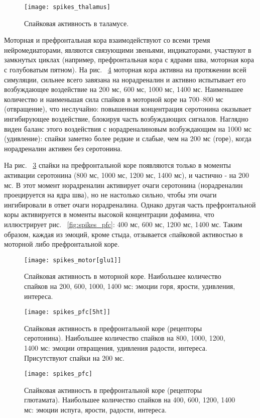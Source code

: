\begin{figure}
	\centering
	\texttt{[image: spikes\_thalamus]}
	\caption{Спайковая активность в таламусе.}
	\label{fig:spikes_thalamus}
\end{figure}

Моторная и префронтальная кора взаимодействуют со всеми тремя нейромедиаторами, являются связующими звеньями, индикаторами, участвуют в замкнутых циклах (например, префронтальная кора с ядрами шва, моторная кора с голубоватым пятном). На рис. ~\ref{fig:spikes_motor} моторная кора активна на протяжении всей симуляции, сильнее всего завязана на норадреналин и активно испытывает его возбуждающее воздействие на 200 мс, 600 мс, 1000 мс, 1400 мс. Наименьшее количество и наименьшая сила спайков в моторной коре на 700--800 мс (отвращение), что неслучайно: повышенная концентрация серотонина оказывает ингибирующее воздействие, блокируя часть возбуждающих сигналов. Наглядно виден баланс этого воздействия с норадреналиновым возбуждающим на 1000 мс (удивление): спайки заметно более редкие и слабые, чем на 200 мс (горе), когда норадреналин активен без серотонина.


На рис. ~\ref{fig:spikes_pfc[5ht]} спайки на префронтальной коре появляются только в моменты активации серотонина (800 мс, 1000 мс, 1200 мс, 1400 мс), и частично - на 200 мс. В этот момент норадреналин активирует очаги серотонина (норадреналин проецируется на ядра шва), но не настолько сильно, чтобы эти очаги ингибировали в ответ очаги норадреналина. Однако другая часть префронтальной коры активируется в моменты высокой концентрации дофамина, что иллюстрирует рис.  ~\ref{fig:spikes_pfc}: 400 мс, 600 мс, 1200 мс, 1400 мс. Таким образом, каждая из эмоций, кроме стыда, отзывается cпайковой активостью в моторной либо префронтальной коре.


\begin{figure}
	\centering
	\texttt{[image: spikes\_motor[glu1]]}
	\caption{Спайковая активность в моторной коре. Наибольшее количество спайков на 200, 600, 1000, 1400 мс: эмоции горя, ярости, удивления, интереса.}
	\label{fig:spikes_motor}
\end{figure}

\begin{figure}
	\centering
	\texttt{[image: spikes\_pfc[5ht]]}
	\caption{Спайковая активность в префронтальной коре (рецепторы серотонина).  Наибольшее количество спайков на 800, 1000, 1200, 1400 мс: эмоции отвращения, удивления радости, интереса. Присутствуют спайки на 200 мс.}
	\label{fig:spikes_pfc[5ht]}
\end{figure}


\begin{figure}
	\centering
	\texttt{[image: spikes\_pfc]}
	\caption{Спайковая активность в префронтальной коре (рецепторы глютамата).  Наибольшее количество спайков на 400, 600, 1200, 1400 мс: эмоции испуга, ярости, радости, интереса.}
	\label{fig:spikes_motor}
\end{figure}



